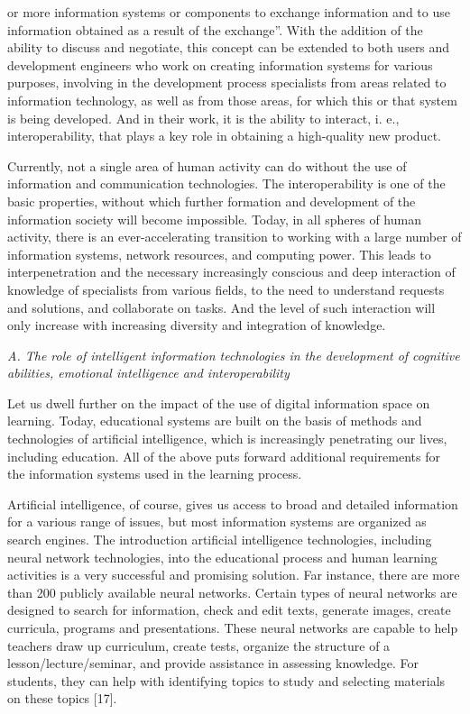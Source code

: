 \documentclass[10pt, a4paper]{article}
\begin{document}
    \begin{multicols}{2}
        \noindent
        or more information systems or components to exchange information and to use information obtained as a result of the exchange”. With the addition of the ability to discuss and negotiate, this concept can be extended to both users and development engineers who work on creating information systems for various purposes, involving in the development process specialists from areas related to information technology, as well as from those areas, for which this or that system is being developed. And in their work, it is the ability to interact, i. e., interoperability, that plays a key role in obtaining a high-quality new product.
        
        Currently, not a single area of human activity can do without the use of information and communication technologies. The interoperability is one of the basic properties, without which further formation and development of the information society will become impossible. Today, in all spheres of human activity, there is an ever-accelerating transition to working with a large number of information systems, network resources, and computing power. This leads to interpenetration and the necessary increasingly conscious and deep interaction of knowledge of specialists from various fields, to the need to understand requests and solutions, and collaborate on tasks. And the level of such interaction will only increase with increasing diversity and integration of knowledge.
        \newline
        
        \noindent
        \textit{A. The role of intelligent information technologies in the development of cognitive abilities, emotional intelligence and interoperability}
        \newline
        
        Let us dwell further on the impact of the use of digital information space on learning. Today, educational systems are built on the basis of methods and technologies of artificial intelligence, which is increasingly penetrating our lives, including education. All of the above puts forward additional requirements for the information systems used in the learning process.

        Artificial intelligence, of course, gives us access to broad and detailed information for a various range of issues, but most information systems are organized as search engines. The introduction artificial intelligence technologies, including neural network technologies, into the educational process and human learning activities is a very successful and promising solution. Far instance, there are more than 200 publicly available neural networks. Certain types of neural networks are designed to search for information, check and edit texts, generate images, create curricula, programs and presentations. These neural networks are capable to help teachers draw up curriculum, create tests, organize the structure of a lesson/lecture/seminar, and provide assistance in assessing knowledge. For students, they can help with identifying topics to study and selecting materials on these topics [17].
        

\end{multicols}
\end{document}

